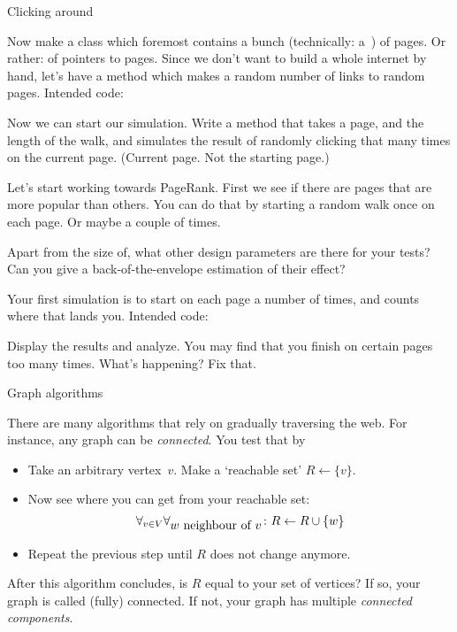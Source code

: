  {Clicking around}

\begin{exercise}
  Now make a class  which foremost contains a bunch
  (technically: a~) of pages. Or rather: of pointers to
  pages.
  Since we don't want to build a whole internet by hand, let's have a
  method  which makes a random number of links
  to random pages.
  Intended code:

  Now we can start our simulation. Write a method 
  that takes a page, and the length of the walk, and simulates the
  result of randomly clicking that many times on the current
  page. (Current page. Not the starting page.)
\end{exercise}

Let's start working towards PageRank. First we see if there are pages
that are more popular than others. You can do that by starting a
random walk once on each page. Or maybe a couple of times.

\begin{exercise}
  Apart from the size of, what other design parameters are there for
  your tests? Can you give a back-of-the-envelope estimation of their effect?
\end{exercise}

\begin{exercise}
  Your first simulation is to start on each page a number of times,
  and counts where that lands you.
  Intended code:

  Display the results and analyze. You may find that you finish on
  certain pages too many times. What's happening? Fix that.
\end{exercise}

 {Graph algorithms}

There are many algorithms that rely on gradually traversing the
web. For instance, any graph can be
\emph{connected}. You test that by
\begin{itemize}
\item Take an arbitrary vertex~$v$. Make a `reachable set'
  $R\leftarrow\{v\}$.
\item Now see where you can get from your reachable set:
  \[ \forall_{v\in V}\forall_{\hbox{$w$ neighbour of $v$}}\colon
  R\leftarrow R\cup \{w\}
  \]
\item Repeat the previous step until $R$ does not change anymore. 
\end{itemize}
After this algorithm concludes, is $R$ equal to your set of vertices?
If so, your graph is called (fully) connected. If not, your graph has
multiple
%
\emph{connected components}.

